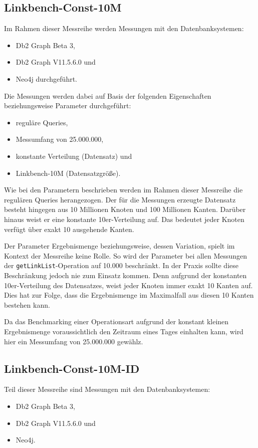 \subsection{Linkbench-Const-10M}
Im Rahmen dieser Messreihe werden Messungen mit den Datenbanksystemen:
\begin{itemize}
    \item Db2 Graph Beta 3,
    \item Db2 Graph V11.5.6.0 und 
    \item Neo4j durchgeführt. 
\end{itemize}
Die Messungen werden dabei auf Basis der folgenden Eigenschaften beziehungsweise Parameter durchgeführt:
\begin{itemize}
    \item reguläre Queries,
    \item Messumfang von 25.000.000,
    \item konstante Verteilung (Datensatz) und
    \item Linkbench-10M (Datensatzgröße).
\end{itemize}
Wie bei den Parametern beschrieben werden im Rahmen dieser Messreihe die regulären Queries herangezogen. Der für die Messungen erzeugte Datensatz besteht hingegen aus 10 Millionen Knoten und 100 Millionen Kanten. Darüber hinaus weist er eine konstante 10er-Verteilung auf. Das bedeutet jeder Knoten verfügt über exakt 10 ausgehende Kanten. 

Der Parameter Ergebnismenge beziehungsweise, dessen Variation, spielt im Kontext der Messreihe keine Rolle. So wird der Parameter bei allen Messungen der \texttt{getLinkList}-Operation auf 10.000 beschränkt. In der Praxis sollte diese Beschränk\-ung jedoch nie zum Einsatz kommen. Denn aufgrund der konstanten 10er-Verteilung des Datensatzes, weist jeder Knoten immer exakt 10 Kanten auf. Dies hat zur Folge, dass die Ergebnismenge im Maximalfall aus diesen 10 Kanten bestehen kann. 

Da das Benchmarking einer Operationsart aufgrund der konstant kleinen Ergebnismenge voraussichtlich den Zeitraum eines Tages einhalten kann, wird hier ein Messumfang von 25.000.000 gewählz.

\subsection{Linkbench-Const-10M-ID}
Teil dieser Messreihe sind Messungen mit den Datenbanksystemen:
\begin{itemize}
    \item Db2 Graph Beta 3,
    \item Db2 Graph V11.5.6.0 und 
    \item Neo4j. 
\end{itemize}

